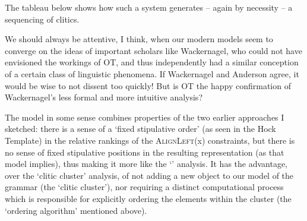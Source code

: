 \documentclass[output=paper,
modfonts
]{LSP/langsci}
\begin{document}
The tableau below shows how such a system generates -- again by necessity -- a
sequencing of clitics.

We should always be attentive, I think, when our modern models seem to converge
on the ideas of important scholars like Wackernagel, who could not have envisioned the workings
of OT, and thus independently had a similar conception of a certain class of linguistic phenomena.
If Wackernagel and Anderson agree, it would be wise to not dissent too quickly!
But is OT the happy confirmation of Wackernagel's less formal and more intuitive analysis?

The model in some sense combines properties of the two earlier approaches I sketched: there
is a sense of a `fixed stipulative order' (as seen in the Hock Template) in the relative rankings of
the \textsc{AlignLeft}(x) constraints, but there is no sense of fixed stipulative positions in the
resulting representation (as that model implies), thus making it more like the `'
analysis. It has the advantage, over the `clitic cluster' analysis, of not adding a new object
to our model of the grammar (the `clitic cluster'), nor requiring a distinct computational
process which is responsible for explicitly ordering the elements within the cluster (the `ordering
algorithm' mentioned above).
\end{document}
